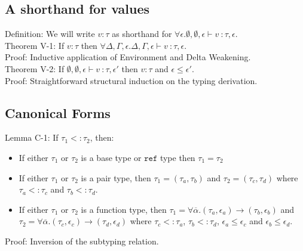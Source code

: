 \documentclass{article}
\begin{document}
\subsection*{A shorthand for values}
Definition: We will write $v : \tau$ as shorthand for $\forall \epsilon. \emptyset, \emptyset, \epsilon \vdash v\ \colon \tau, \epsilon$.
\\

\noindent Theorem V-1: If $v : \tau$ then $\forall \Delta, \Gamma, \epsilon. \Delta, \Gamma, \epsilon \vdash v\ \colon \tau, \epsilon$.
\\

\noindent Proof: Inductive application of Environment and Delta Weakening.
\\

\noindent Theorem V-2: If $\emptyset, \emptyset, \epsilon \vdash v\ \colon \tau, \epsilon'$ then $v : \tau$ and $\epsilon \leq \epsilon'$.
\\

\noindent Proof: Straightforward structural induction on the typing derivation.

\subsection*{Canonical Forms}
Lemma C-1: If $\tau_1 <: \tau_2$, then:
\begin{itemize}
	\item If either $\tau_1$ or $\tau_2$ is a base type or $\texttt{ref}$ type then $\tau_1 = \tau_2$
	\item If either $\tau_1$ or $\tau_2$ is a pair type, then $\tau_1 = (\tau_a, \tau_b)$ and $\tau_2 = (\tau_c, \tau_d)$ where $\tau_a <: \tau_c$ and $\tau_b <: \tau_d$.
	\item If either $\tau_1$ or $\tau_2$ is a function type, then $\tau_1 = \forall \overline \alpha. (\tau_a, \epsilon_a) \rightarrow (\tau_b, \epsilon_b)$ and $\tau_2 = \forall \overline \alpha. (\tau_c, \epsilon_c) \rightarrow (\tau_d, \epsilon_d)$ where $\tau_c <: \tau_a$, $\tau_b <: \tau_d$, $\epsilon_a \leq \epsilon_c$ and $\epsilon_b \leq \epsilon_d$.
\end{itemize} 

\noindent Proof: Inversion of the subtyping relation.
\\
\end{document}
